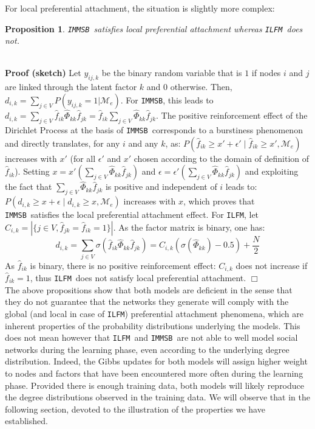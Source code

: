 \documentclass[journal]{IEEEtran}
\newcommand{\ifm}{\texttt{ILFM}}
\newcommand{\imb}{\texttt{IMMSB}}
\newcommand{\pr}{P}
\newtheorem{proposition}{Proposition}[section]
\begin{document}
%
For local preferential attachment, the situation is slightly more complex:~\\
%
\begin{proposition}
\label{pref-attch-loc}
\imb\ satisfies local preferential attachment whereas \ifm\ does not.
\end{proposition}~\\
%
\noindent \textbf{Proof (sketch)} Let $y_{ij,k}$ be the binary random variable that is $1$ if nodes $i$ and $j$ are linked through the latent factor $k$ and $0$ otherwise. Then, $d_{i,k} = \sum_{j \in V} \pr(y_{ij,k} =1 | \mathcal{M}_e)$. For \imb, this leads to $d_{i,k} = \sum_{j \in V} \hat{f}_{ik} \hat{\Phi}_{kk} \hat{f}_{jk} = \hat{f}_{ik} \sum_{j \in V} \hat{\Phi}_{kk} \hat{f}_{jk}$. The positive reinforcement effect of the Dirichlet Process \cite{HDP} at the basis of \imb\ corresponds to a burstiness phenomenon and directly translates, for any $i$ and any $k$, as: $\pr(\hat{f}_{ik} \ge x'+\epsilon' \mid \hat{f}_{ik} \ge x',\mathcal{M}_e)$ increases with $x'$ (for all $\epsilon'$ and $x'$ chosen according to the domain of definition of $\hat{f}_{ik}$). Setting $x=x'(\sum_{j\in V} \hat{\Phi}_{kk} \hat{f}_{jk})$ and $\epsilon = \epsilon'(\sum_{j\in V} \hat{\Phi}_{kk} \hat{f}_{jk})$ and exploiting the fact that $\sum_{j\in V} \hat{\Phi}_{kk} \hat{f}_{jk}$ is positive and independent of $i$ leads to: $\pr(d_{i,k} \ge x+\epsilon \mid d_{i,k} \ge x, \mathcal{M}_e)$ increases with $x$, which proves that \imb\ satisfies the local preferential attachment effect. For \ifm,  let $C_{i,k} = |\{j \in V, \hat{f}_{jk} = \hat{f}_{ik} = 1\}|$. As the factor matrix is binary, one has:
%
\[ 
d_{i,k} = \sum_{j\in V} \sigma(\hat{f}_{ik} \hat{\Phi}_{kk} \hat{f}_{jk}) =  C_{i,k} (\sigma(\hat{\Phi}_{kk})-0.5) + \frac{N}{2}
\]
%
As $\hat{f}_{ik}$ is binary, there is no positive reinforcement effect: $C_{i,k}$ does not increase if $\hat{f}_{ik}=1$, thus \ifm\ does not satisfy local preferential attachment. \hspace{4.69cm} $\Box$~\\

The above propositions show that both models are deficient in the sense that they do not guarantee that the networks they generate will comply with the global (and local in case of \ifm) preferential attachment phenomena, which are inherent properties of the probability distributions underlying the models. This does not mean however that \ifm\ and \imb\ are not able to well model social networks during the learning phase, even according to the underlying degree distribution. Indeed, the Gibbs updates for both models will assign higher weight to nodes and factors that have been encountered more often during the learning phase. Provided there is enough training data, both models will likely reproduce the degree distributions observed in the training data. We will observe that in the following section, devoted to the illustration of the properties we have established.
\end{document}
